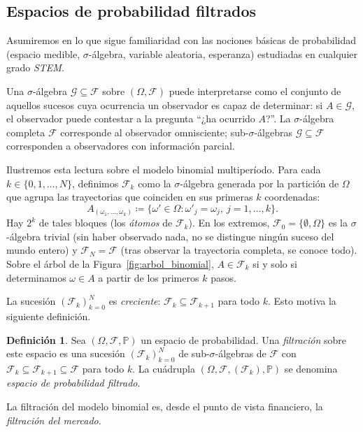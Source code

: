 \documentclass[11pt,a4paper,oneside]{report}
\theoremstyle{plain}
\theoremstyle{definition}
\newtheorem{definicion}[teorema]{Definición}
\theoremstyle{remark}
\newcommand{\PP}{\mathbb{P}}
\newcommand{\F}{\mathcal{F}}
\newcommand{\G}{\mathcal{G}}
\newcommand{\1}{\mathbf{1}}
\newcommand{\eqdef}{\coloneqq}
\begin{document}
\subsection{Espacios de probabilidad filtrados}
\label{subsec:filtraciones}

Asumiremos en lo que sigue familiaridad con las nociones básicas de
probabilidad (espacio medible, $\sigma$-álgebra, variable aleatoria,
esperanza) estudiadas en cualquier grado \emph{STEM}.

Una $\sigma$-álgebra $\G \subseteq \F$ sobre $(\Omega, \F)$
puede interpretarse como el conjunto de aquellos sucesos cuya
ocurrencia un observador es capaz de determinar: si $A \in \G$, el
observador puede contestar a la pregunta ``¿ha ocurrido $A$?''. La
$\sigma$-álgebra completa $\F$ corresponde al observador omnisciente;
sub-$\sigma$-álgebras $\G \subseteq \F$ corresponden a observadores con
información parcial.

Ilustremos esta lectura sobre el modelo binomial multiperíodo. Para
cada $k \in \{0, 1, \ldots, N\}$, definimos $\F_k$ como la
$\sigma$-álgebra generada por la partición de $\Omega$ que agrupa las
trayectorias que coinciden en sus primeras $k$ coordenadas:
\begin{equation*}
  A_{(\omega_1, \ldots, \omega_k)} \eqdef
  \bigl\{\omega' \in \Omega : \omega'_j = \omega_j,\ j = 1, \ldots, k\bigr\}.
\end{equation*}
Hay $2^k$ de tales bloques (los \emph{átomos} de $\F_k$). En los
extremos, $\F_0 = \{\emptyset, \Omega\}$ es la $\sigma$-álgebra trivial
(sin haber observado nada, no se distingue ningún suceso del mundo
entero) y $\F_N = \F$ (tras observar la trayectoria completa, se conoce
todo). Sobre el árbol de la Figura~\ref{fig:arbol_binomial}, $A \in
\F_k$ si y solo si determinamos $\omega \in A$ a partir de los primeros
$k$ pasos.

La sucesión $(\F_k)_{k=0}^{N}$ es \emph{creciente}: $\F_k \subseteq
\F_{k+1}$ para todo $k$. Esto motiva la siguiente definición.

\begin{definicion}
\label{def:filtracion}
Sea $(\Omega, \F, \PP)$ un espacio de probabilidad. Una
\emph{filtración} sobre este espacio es una sucesión $(\F_k)_{k=0}^{N}$
de sub-$\sigma$-álgebras de $\F$ con $\F_k \subseteq \F_{k+1} \subseteq
\F$ para todo $k$. La cuádrupla $(\Omega, \F, (\F_k), \PP)$ se denomina
\emph{espacio de probabilidad filtrado}.
\end{definicion}

La filtración del modelo binomial es, desde el punto de vista
financiero, la \emph{filtración del mercado}.
\end{document}
